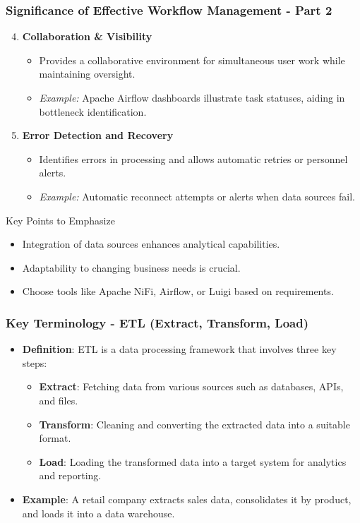\documentclass[aspectratio=169]{beamer}
\begin{document}
\begin{frame}[fragile]
    \frametitle{Significance of Effective Workflow Management - Part 2}
    \begin{enumerate}
        \setcounter{enumi}{3} %
        \item \textbf{Collaboration \& Visibility}
        \begin{itemize}
            \item Provides a collaborative environment for simultaneous user work while maintaining oversight.
            \item \textit{Example:} Apache Airflow dashboards illustrate task statuses, aiding in bottleneck identification.
        \end{itemize}

        \item \textbf{Error Detection and Recovery}
        \begin{itemize}
            \item Identifies errors in processing and allows automatic retries or personnel alerts.
            \item \textit{Example:} Automatic reconnect attempts or alerts when data sources fail.
        \end{itemize}
    \end{enumerate}
    
    \begin{block}{Key Points to Emphasize}
        \begin{itemize}
            \item Integration of data sources enhances analytical capabilities.
            \item Adaptability to changing business needs is crucial.
            \item Choose tools like Apache NiFi, Airflow, or Luigi based on requirements.
        \end{itemize}
    \end{block}
\end{frame}

\begin{frame}[fragile]
    \frametitle{Key Terminology - ETL (Extract, Transform, Load)}
    \begin{itemize}
        \item \textbf{Definition}: 
        ETL is a data processing framework that involves three key steps:
        \begin{itemize}
            \item \textbf{Extract}: Fetching data from various sources such as databases, APIs, and files.
            \item \textbf{Transform}: Cleaning and converting the extracted data into a suitable format.
            \item \textbf{Load}: Loading the transformed data into a target system for analytics and reporting.
        \end{itemize}
        \item \textbf{Example}: 
        A retail company extracts sales data, consolidates it by product, and loads it into a data warehouse.
    \end{itemize}
\end{frame}
\end{document}
